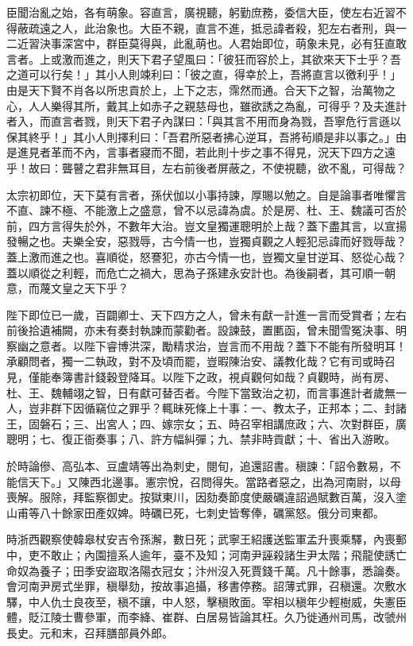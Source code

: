 \begin{pinyinscope}
 臣聞治亂之始，各有萌象。容直言，廣視聽，躬勤庶務，委信大臣，使左右近習不得蔽疏遠之人，此治象也。大臣不親，直言不進，抵忌諱者殺，犯左右者刑，與一二近習決事深宮中，群臣莫得與，此亂萌也。人君始即位，萌象未見，必有狂直敢言者。上或激而進之，則天下君子望風曰：「彼狂而容於上，其欲來天下士乎？吾之道可以行矣！」其小人則竦利曰：「彼之直，得幸於上，吾將直言以徼利乎！」由是天下賢不肖各以所忠貢於上，上下之志，霈然而通。合天下之智，治萬物之心，人人樂得其所，戴其上如赤子之親慈母也，雖欲誘之為亂，可得乎？及夫進計者入，而直言者戮，則天下君子內謀曰：「與其言不用而身為戮，吾寧危行言遜以保其終乎！」其小人則擇利曰：「吾君所惡者拂心逆耳，吾將茍順是非以事之。」由是進見者革而不內，言事者寢而不聞，若此則十步之事不得見，況天下四方之遠乎！故曰：聾瞽之君非無耳目，左右前後者屏蔽之，不使視聽，欲不亂，可得哉？



 太宗初即位，天下莫有言者，孫伏伽以小事持諫，厚賜以勉之。自是論事者唯懼言不直、諫不極、不能激上之盛意，曾不以忌諱為虞。於是房、杜、王、魏議可否於前，四方言得失於外，不數年大治。豈文皇獨運聰明於上哉？蓋下盡其言，以宣揚發暢之也。夫樂全安，惡戮辱，古今情一也，豈獨貞觀之人輕犯忌諱而好戮辱哉？蓋上激而進之也。喜順從，怒謇犯，亦古今情一也，豈獨文皇甘逆耳、怒從心哉？蓋以順從之利輕，而危亡之禍大，思為子孫建永安計也。為後嗣者，其可順一朝意，而蔑文皇之天下乎？



 陛下即位已一歲，百闢卿士、天下四方之人，曾未有獻一計進一言而受賞者；左右前後拾遺補闕，亦未有奏封執諫而蒙勸者。設諫鼓，置匭函，曾未聞雪冤決事、明察幽之意者。以陛下睿博洪深，勵精求治，豈言而不用哉？蓋下不能有所發明耳！承顧問者，獨一二執政，對不及頃而罷，豈暇陳治安、議教化哉？它有司或時召見，僅能奉簿書計錢穀登降耳。以陛下之政，視貞觀何如哉？貞觀時，尚有房、杜、王、魏輔翊之智，日有獻可替否者。今陛下當致治之初，而言事進計者歲無一人，豈非群下因循竊位之罪乎？輒昧死條上十事：一、教太子，正邦本；二、封諸王，固磐石；三、出宮人；四、嫁宗女；五、時召宰相講庶政；六、次對群臣，廣聰明；七、復正衙奏事；八、許方幅糾彈；九、禁非時貢獻；十、省出入游畋。



 於時論傪、高弘本、豆盧靖等出為刺史，閱旬，追還詔書。稹諫：「詔令數易，不能信天下。」又陳西北邊事。憲宗悅，召問得失。當路者惡之，出為河南尉，以母喪解。服除，拜監察御史。按獄東川，因劾奏節度使嚴礪違詔過賦數百萬，沒入塗山甫等八十餘家田產奴婢。時礪已死，七刺史皆奪俸，礪黨怒。俄分司東都。



 時浙西觀察使韓皋杖安吉令孫澥，數日死；武寧王紹護送監軍孟升喪乘驛，內喪郵中，吏不敢止；內園擅系人逾年，臺不及知；河南尹誣殺諸生尹太階；飛龍使誘亡命奴為養子；田季安盜取洛陽衣冠女；汴州沒入死賈錢千萬。凡十餘事，悉論奏。會河南尹房式坐罪，稹舉劾，按故事追攝，移書停務。詔薄式罪，召稹還。次敷水驛，中人仇士良夜至，稹不讓，中人怒，擊稹敗面。宰相以稹年少輕樹威，失憲臣體，貶江陵士曹參軍，而李絳、崔群、白居易皆論其枉。久乃徙通州司馬，改虢州長史。元和末，召拜膳部員外郎。




\end{pinyinscope}

